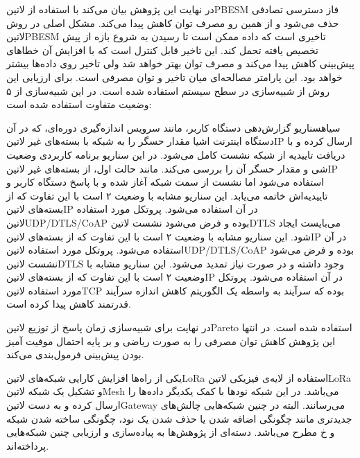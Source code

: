 در نهایت این پژوهش بیان می‌کند با استفاده از ‌لاتین{PBESM} فاز دسترسی تصادفی حذف می‌شود و از همین رو مصرف توان کاهش پیدا می‌کند.
مشکل اصلی در روش ‌لاتین{PBESM} تاخیری است که داده ممکن است تا رسیدن به شروع بازه از پیش تخصیص یافته تحمل کند.
این تاخیر قابل کنترل است که با افزایش آن خطاهای پیش‌بینی کاهش پیدا می‌کند و مصرف توان بهتر خواهد شد ولی تاخیر روی داده‌ها بیشتر خواهد بود.
این پارامتر مصالحه‌ای میان تاخیر و توان مصرفی است. برای ارزیابی این روش از شبیه‌سازی در سطح سیستم استفاده شده است.
در این شبیه‌سازی از ۵ وضعیت متفاوت استفاده شده است:

 ‌سیاه{سناریو گزارش‌دهی دستگاه کاربر}، مانند سرویس اندازه‌گیری دوره‌ای، که در آن دستگاه اینترنت اشیا مقدار حسگر را
به شبکه با بسته‌های غیر ‌لاتین{IP} ارسال کرده و با دریافت تاییدیه از شبکه نشست کامل می‌شود.
 در این سناریو برنامه کاربردی وضعیت شی و مقدار حسگر آن را بررسی می‌کند. مانند حالت اول، از بسته‌های غیر ‌لاتین{IP} استفاده می‌شود اما
نشست از سمت شبکه آغاز شده و با پاسخ دستگاه کاربر و تاییدیه‌اش خاتمه می‌یابد.
 این سناریو مشابه با وضعیت ۲ است با این تفاوت که از بسته‌های ‌لاتین{IP} در آن استفاده می‌شود. پروتکل مورد استفاده ‌لاتین{UDP/DTLS/CoAP} بوده و فرض می‌شود نشست ‌لاتین{DTLS} می‌بایست ایجاد شود.
 این سناریو مشابه با وضعیت ۲ است با این تفاوت که از بسته‌های ‌لاتین{IP} در آن استفاده می‌شود. پروتکل مورد استفاده ‌لاتین{UDP/DTLS/CoAP} بوده و فرض می‌شود نشست ‌لاتین{DTLS} وجود داشته و در صورت نیاز تمدید می‌شود.
 این سناریو مشابه با وضعیت ۲ است با این تفاوت که از بسته‌های ‌لاتین{IP} در آن استفاده می‌شود. پروتکل مورد استفاده ‌لاتین{TCP} بوده که سرآیند به واسطه یک الگوریتم کاهش اندازه سرآیند قدرتمند کاهش پیدا کرده است.

در نهایت برای شبیه‌سازی زمان پاسخ از توزیع ‌لاتین{Pareto} استفاده شده است. در انتها این پژوهش کاهش توان مصرفی را به صورت ریاضی و بر پایه احتمال موفیت آمیز بودن پیش‌بینی فرمول‌بندی می‌کند.


یکی از راه‌ها افزایش کارایی شبکه‌های ‌لاتین{LoRa} استفاده از لایه‌ی فیزیکی ‌لاتین{LoRa} و تشکیل یک شبکه ‌لاتین{Mesh} می‌باشد. در این شبکه نودها با کمک یکدیگر داده‌ها را ارسال کرده و به دست ‌لاتین{Gateway} می‌رسانند.
البته در چنین شبکه‌هایی چالش‌های جدیدتری مانند چگونگی اضافه شدن یا حذف شدن یک نود، چگونگی ساخته شدن شبکه و ‌خ مطرح می‌باشد. دسته‌ای از پژوهش‌ها به پیاده‌سازی و ارزیابی چنین شبکه‌هایی پرداخته‌اند.


